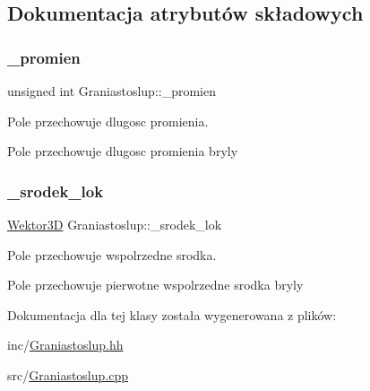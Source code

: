 \subsection{Dokumentacja atrybutów składowych}
\mbox{\label{classGraniastoslup_abaa6352f927e7317a0c02ec27b9a08a0}} 
\subsubsection{\texorpdfstring{\+\_\+promien}{\_promien}}
{\footnotesize\ttfamily unsigned int Graniastoslup\+::\+\_\+promien\hspace{0.3cm}{\ttfamily [private]}}



Pole przechowuje dlugosc promienia. 

Pole przechowuje dlugosc promienia bryly \mbox{\label{classGraniastoslup_a8121bb2dc600bcbe9e852b3776f7df6f}} 
\subsubsection{\texorpdfstring{\+\_\+srodek\+\_\+lok}{\_srodek\_lok}}
{\footnotesize\ttfamily \hyperlink{classSWektor}{Wektor3D} Graniastoslup\+::\+\_\+srodek\+\_\+lok\hspace{0.3cm}{\ttfamily [private]}}



Pole przechowuje wspolrzedne srodka. 

Pole przechowuje pierwotne wspolrzedne srodka bryly 

Dokumentacja dla tej klasy została wygenerowana z plików\+:\begin{DoxyCompactItemize}
\item 
inc/\hyperlink{Graniastoslup_8hh}{Graniastoslup.\+hh}\item 
src/\hyperlink{Graniastoslup_8cpp}{Graniastoslup.\+cpp}\end{DoxyCompactItemize}
